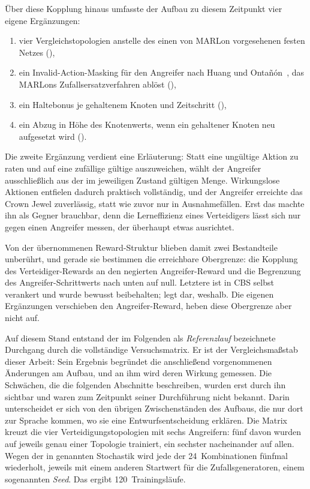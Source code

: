 Über diese Kopplung hinaus umfasste der Aufbau zu diesem Zeitpunkt vier
eigene Ergänzungen:
%
\begin{enumerate}
  \item vier Vergleichstopologien anstelle des einen von MARLon
        vorgesehenen festen Netzes (),
  \item ein Invalid-Action-Masking für den Angreifer nach Huang und
        Ontañón~\autocite{huang2022masking}, das MARLons
        Zufallsersatzverfahren ablöst (),
  \item ein Haltebonus je gehaltenem Knoten und Zeitschritt
        (),
  \item ein Abzug in Höhe des Knotenwerts, wenn ein gehaltener Knoten neu
        aufgesetzt wird ().
\end{enumerate}
%
Die zweite Ergänzung verdient eine Erläuterung: Statt eine ungültige Aktion
zu raten und auf eine zufällige gültige auszuweichen, wählt der Angreifer
ausschließlich aus der im jeweiligen Zustand gültigen Menge. Wirkungslose
Aktionen entfielen dadurch praktisch vollständig, und der Angreifer
erreichte das Crown Jewel zuverlässig, statt wie zuvor nur in
Ausnahmefällen. Erst das machte ihn als Gegner brauchbar, denn die
Lerneffizienz eines Verteidigers lässt sich nur gegen einen Angreifer
messen, der überhaupt etwas ausrichtet.

Von der übernommenen Reward-Struktur blieben damit zwei Bestandteile unberührt,
und gerade sie bestimmen die erreichbare Obergrenze: die Kopplung des
Verteidiger-Rewards an den negierten Angreifer-Reward und die Begrenzung des
Angreifer-Schrittwerts nach unten auf null. Letztere ist in \ac{CBS} selbst
verankert und wurde bewusst beibehalten;  legt dar, weshalb.
Die eigenen Ergänzungen verschieben den Angreifer-Reward, heben diese
Obergrenze aber nicht auf.

Auf diesem Stand entstand der im Folgenden als \emph{Referenzlauf} bezeichnete
Durchgang durch die vollständige Versuchsmatrix. Er ist der Vergleichsmaßstab
dieser Arbeit: Sein Ergebnis begründet die anschließend vorgenommenen
Änderungen am Aufbau, und an ihm wird deren Wirkung gemessen. Die Schwächen,
die die folgenden Abschnitte beschreiben, wurden erst durch ihn sichtbar und
waren zum Zeitpunkt seiner Durchführung nicht bekannt. Darin unterscheidet er
sich von den übrigen Zwischenständen des Aufbaus, die nur dort zur Sprache
kommen, wo sie eine Entwurfsentscheidung erklären. Die Matrix kreuzt die vier
Verteidigungstopologien mit sechs Angreifern: fünf davon wurden auf jeweils
genau einer Topologie trainiert, ein sechster nacheinander auf allen. Wegen der
in  genannten Stochastik wird jede der
24~Kombinationen fünfmal wiederholt, jeweils mit einem anderen Startwert für die
Zufallsgeneratoren, einem sogenannten \emph{Seed}. Das ergibt
\num{120}~Trainingsläufe.

